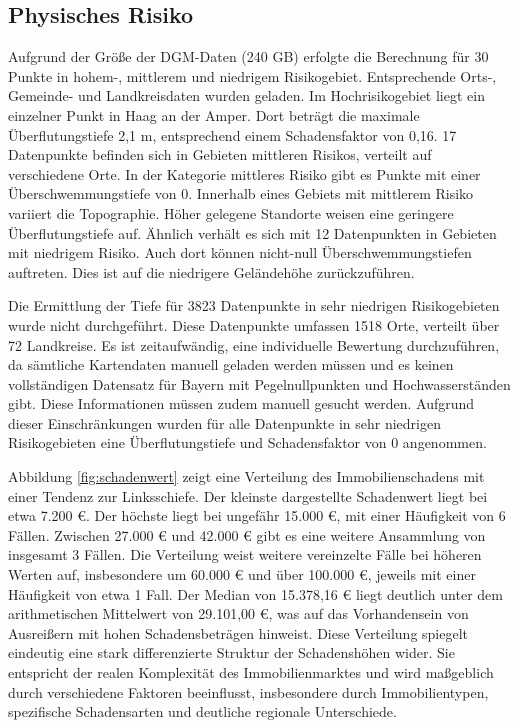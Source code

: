 \subsection{Physisches Risiko}
Aufgrund der Größe der \ac{DGM}-Daten (240 GB) erfolgte die Berechnung für 30 Punkte in hohem-, mittlerem und niedrigem Risikogebiet. Entsprechende Orts-, Gemeinde- und Landkreisdaten wurden geladen.
Im Hochrisikogebiet liegt ein einzelner Punkt in Haag an der Amper. Dort beträgt die maximale Überflutungstiefe 2,1 m, entsprechend einem Schadensfaktor von 0,16.
17 Datenpunkte befinden sich in Gebieten mittleren Risikos, verteilt auf verschiedene Orte. In der Kategorie mittleres Risiko gibt es Punkte mit einer Überschwemmungstiefe von 0. Innerhalb eines Gebiets mit mittlerem Risiko variiert die Topographie. Höher gelegene Standorte weisen eine geringere Überflutungstiefe auf. Ähnlich verhält es sich mit 12 Datenpunkten in Gebieten mit niedrigem Risiko. Auch dort können nicht-null Überschwemmungstiefen auftreten. Dies ist auf die niedrigere Geländehöhe zurückzuführen. 

Die Ermittlung der Tiefe für 3823 Datenpunkte in sehr niedrigen Risikogebieten wurde nicht durchgeführt. Diese Datenpunkte umfassen 1518 Orte, verteilt über 72 Landkreise. Es ist zeitaufwändig, eine individuelle Bewertung durchzuführen, da sämtliche Kartendaten manuell geladen werden müssen und es keinen vollständigen Datensatz für Bayern mit Pegelnullpunkten und Hochwasserständen gibt. Diese Informationen müssen zudem manuell gesucht werden. Aufgrund dieser Einschränkungen wurden für alle Datenpunkte in sehr niedrigen Risikogebieten eine Überflutungstiefe und Schadensfaktor von 0 angenommen.

Abbildung \ref{fig:schadenwert} zeigt eine Verteilung des Immobilienschadens mit einer Tendenz zur Linksschiefe. Der kleinste dargestellte Schadenwert liegt bei etwa 7.200 €. Der höchste liegt bei ungefähr 15.000 €, mit einer Häufigkeit von 6 Fällen. Zwischen 27.000 € und 42.000 € gibt es eine weitere Ansammlung von insgesamt 3 Fällen. Die Verteilung weist weitere vereinzelte Fälle bei höheren Werten auf, insbesondere um 60.000 € und über 100.000 €, jeweils mit einer Häufigkeit von etwa 1 Fall.  Der Median von 15.378,16 € liegt deutlich unter dem arithmetischen Mittelwert von 29.101,00 €, was auf das Vorhandensein von Ausreißern mit hohen Schadensbeträgen hinweist. Diese Verteilung spiegelt eindeutig eine stark differenzierte Struktur der Schadenshöhen wider. Sie entspricht der realen Komplexität des Immobilienmarktes und wird maßgeblich durch verschiedene Faktoren beeinflusst, insbesondere durch Immobilientypen, spezifische Schadensarten und deutliche regionale Unterschiede.



